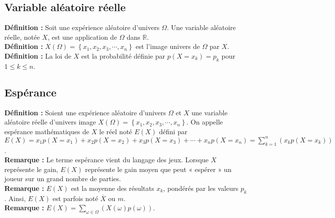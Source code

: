 \documentclass[a4paper,titlepage]{article}
\begin{document}
    \subsection{Variable aléatoire réelle}
        \textbf{Définition :} Soit une expérience aléatoire d’univers $\varOmega$. Une variable aléatoire réelle, notée $X$, est une application de $\varOmega$ dans $\mathbb{R}$.
        \\
        \textbf{Définition :} $X\left(\varOmega\right)=\left\{x_{1},x_{2},x_{3},\cdots,x_{n}\right\}$ est l’image univers de $\varOmega$ par $X$.
        \\
        \textbf{Définition :} La loi de $X$ est la probabilité définie par $p\left(X=x_{k}\right)=p_{k}$ pour $1\leqslant k\leqslant n$.
    \subsection{Espérance}
        \textbf{Définition :} Soient une expérience aléatoire d’univers $\varOmega$ et $X$ une variable aléatoire réelle d’univers image $X\left(\varOmega\right)=\left\{x_{1},x_{2},x_{3},\cdots,x_{n}\right\}$. On appelle espérance mathématiques de $X$ le réel noté $E\left(X\right)$ défini par $E\left(X\right)=x_{1}p\left(X=x_{1}\right)+x_{2}p\left(X=x_{2}\right)+x_{3}p\left(X=x_{3}\right)+\cdots+x_{n}p\left(X=x_{n}\right)=\sum\limits_{k=1}^{n}\left(x_{k}p\left(X=x_{k}\right)\right)$.
        \\
        \textbf{Remarque :} Le terme espérance vient du langage des jeux. Lorsque $X$ représente le gain, $E\left(X\right)$ représente le gain moyen que peut « espérer » un joueur sur un grand nombre de parties.
        \\
        \textbf{Remarque :} $E\left(X\right)$ est la moyenne des résultats $x_{k}$, pondérés par les valeurs $p_{k}$. Ainsi, $E\left(X\right)$ est parfois noté $\overline{X}$ ou $m$.
        \\
        \textbf{Remarque :} $E\left(X\right)=\sum\limits_{\omega\in\varOmega}\left(X\left(\omega\right)p\left(\omega\right)\right)$.
\end{document}
